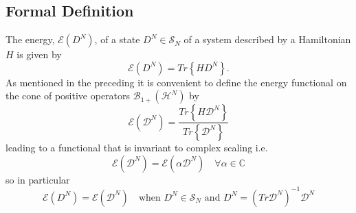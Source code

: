 \documentclass[aps,preprint]{revtex4}%
\begin{document}
\subsection{Formal Definition}

The energy, $\mathcal{E}\left(  D^{N}\right)  $, of a state $D^{N}%
\in\mathcal{S}_{N}$ of a system described by a Hamiltonian $H$ is given by
\begin{equation}
\mathcal{E}\left(  D^{N}\right)  =Tr\left\{  HD^{N}\right\}  .
\end{equation}
As mentioned in the preceding it is convenient to define the energy functional
on the cone of positive operators $\mathcal{B}_{1+}\left(  \mathcal{H}%
^{N}\right)  $ by
\begin{equation}
\mathcal{E}\left(  \mathcal{D}^{N}\right)  =\frac{Tr\left\{  H\mathcal{D}%
^{N}\right\}  }{Tr\left\{  \mathcal{D}^{N}\right\}  } \label{EnFunc}%
\end{equation}
leading to a functional that is invariant to complex scaling i.e.%
\begin{equation}
\mathcal{E}\left(  \mathcal{D}^{N}\right)  =\mathcal{E}\left(  \alpha
\mathcal{D}^{N}\right)  \quad\forall\alpha\in\mathbb{C}%
\end{equation}
so in particular
\begin{equation}
\mathcal{E}\left(  D^{N}\right)  =\mathcal{E}\left(  \mathcal{D}^{N}\right)
\quad\text{when }D^{N}\in\mathcal{S}_{N}\text{ and }D^{N}=\left(
Tr\mathcal{D}^{N}\right)  ^{-1}\mathcal{D}^{N}%
\end{equation}
\end{document}
